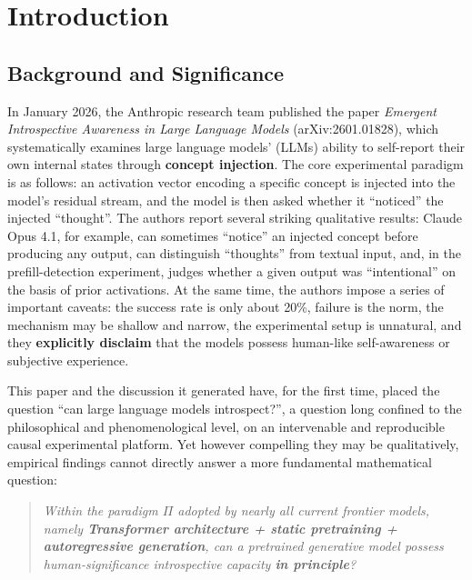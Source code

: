 \section{Introduction}

\subsection{Background and Significance}

In January 2026, the Anthropic research team published the paper
\emph{Emergent Introspective Awareness in Large Language Models}
(arXiv:2601.01828)\cite{lindsey-2026-introspection}, which systematically examines large
language models' (LLMs) ability to self-report their own internal states through
\textbf{concept injection}. The core experimental paradigm is as follows: an activation
vector encoding a specific concept is injected into the model's residual stream, and the model
is then asked whether it ``noticed'' the injected ``thought''. The authors report several striking
qualitative results: Claude Opus 4.1, for example, can sometimes ``notice'' an injected concept
before producing any output, can distinguish ``thoughts'' from textual input, and, in the
prefill-detection experiment, judges whether a given output was ``intentional'' on the basis of
prior activations. At the same time, the authors impose a series of important caveats: the
success rate is only about 20\%, failure is the norm, the mechanism may be shallow and narrow,
the experimental setup is unnatural, and they \textbf{explicitly disclaim} that the models
possess human-like self-awareness or subjective experience\cite{lindsey-2026-introspection}.

This paper and the discussion it generated have, for the first time, placed the question
``can large language models introspect?'', a question long confined to the philosophical and
phenomenological level, on an intervenable and reproducible causal experimental platform.
Yet however compelling they may be qualitatively, empirical findings cannot directly answer
a more fundamental mathematical question:

\begin{quote}
\itshape
Within the paradigm $\Pi$ adopted by nearly all current frontier models, namely
\textbf{Transformer architecture + static pretraining + autoregressive generation}, can a
pretrained generative model possess human-significance introspective capacity \textbf{in
principle}?
\end{quote}

